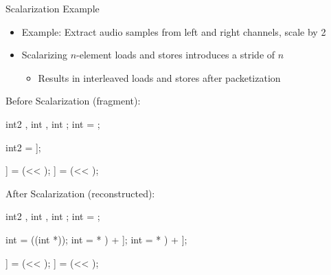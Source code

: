 \begin{frame}[fragile]{Scalarization Example}

\begin{itemize}
    \item Example: Extract audio samples from left and right channels, scale by 2
    \item Scalarizing $n$-element loads and stores introduces a stride of $n$
    \begin{itemize}
        \item Results in interleaved loads and stores after packetization
    \end{itemize}
\end{itemize}

\begin{minipage}[t]{0.45\linewidth}

\vspace{0.1ex}
Before Scalarization (fragment):
\begin{codebox}[commandchars=\\\[\]]
int2 \uniform[*src], int \uniform[*left], int \uniform[*right];
int \varying[tid] = ;


int2 \varying[sample] = \uniform[src]\idx[\varying[tid]];


\uniform[left]\idx[\varying[tid]] = (\varying[sample.x] << \uniform[1]);
\uniform[right]\idx[\varying[tid]] = (\varying[sample.y] << \uniform[1]);
\end{codebox}

\end{minipage}
\hspace{1em}
\begin{minipage}[t]{0.49\linewidth}

\vspace{0.1ex}
After Scalarization (reconstructed):
\begin{codebox}[commandchars=\\\[\]]
int2 \uniform[*src], int \uniform[*left], int \uniform[*right];
int \varying[tid] = ;

int \uniform[*srcScalar] = ((int *)\uniform[src]);
int \varying[sampleLeft] = \uniform[srcScalar]\idx[(\varying[tid] * \uniform[2]) + \uniform[0]];
int \varying[sampleRight] = \uniform[srcScalar]\idx[(\varying[tid] * \uniform[2]) + \uniform[1]];

\uniform[left]\idx[\varying[tid]] = (\varying[sampleLeft] << \uniform[1]);
\uniform[right]\idx[\varying[tid]] = (\varying[sampleRight] << \uniform[1]);
\end{codebox}

\end{minipage}

\end{frame}
